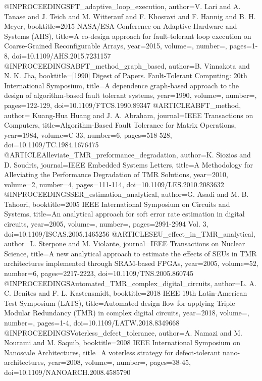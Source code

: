 @INPROCEEDINGS{FT_adaptive_loop_execution,
	author={V. {Lari} and A. {Tanase} and J. {Teich} and M. {Witterauf} and F. {Khosravi} and F. {Hannig} and B. H. {Meyer}},
	booktitle={2015 NASA/ESA Conference on Adaptive Hardware and Systems (AHS)}, 
	title={A co-design approach for fault-tolerant loop execution on Coarse-Grained Reconfigurable Arrays}, 
	year={2015},
	volume={},
	number={},
	pages={1-8},
	doi={10.1109/AHS.2015.7231157}
}
@INPROCEEDINGS{ABFT_method_graph_based,
	author={B. {Vinnakota} and N. K. {Jha}},
	booktitle={[1990] Digest of Papers. Fault-Tolerant Computing: 20th International Symposium}, 
	title={A dependence graph-based approach to the design of algorithm-based fault tolerant systems}, 
	year={1990},
	volume={},
	number={},
	pages={122-129},	
	doi={10.1109/FTCS.1990.89347}
}
@ARTICLE{ABFT_method,
	author={ {Kuang-Hua Huang} and J. A. {Abraham}},
	journal={IEEE Transactions on Computers}, 
	title={Algorithm-Based Fault Tolerance for Matrix Operations}, 
	year={1984},
	volume={C-33},
	number={6},
	pages={518-528},	
	doi={10.1109/TC.1984.1676475}
}
@ARTICLE{Alleviate_TMR_preformance_degradation,
	author={K. {Siozios} and D. {Soudris}},	
	journal={IEEE Embedded Systems Letters}, 	
	title={A Methodology for Alleviating the Performance Degradation of TMR Solutions}, 	
	year={2010},	
	volume={2},	
	number={4},	
	pages={111-114},
	doi={10.1109/LES.2010.2083632}
}
@INPROCEEDINGS{SER_estimation_analytical,
	author={G. {Asadi} and M. B. {Tahoori}},
	booktitle={2005 IEEE International Symposium on Circuits and Systems}, 
	title={An analytical approach for soft error rate estimation in digital circuits}, 
	year={2005},
	volume={},
	number={},
	pages={2991-2994 Vol. 3},	
	doi={10.1109/ISCAS.2005.1465256}
}
@ARTICLE{SEU_effect_in_TMR_analytical,
	author={L. {Sterpone} and M. {Violante}},
	journal={IEEE Transactions on Nuclear Science}, 
	title={A new analytical approach to estimate the effects of SEUs in TMR architectures implemented through SRAM-based FPGAs}, 
	year={2005},
	volume={52},
	number={6},
	pages={2217-2223},	
	doi={10.1109/TNS.2005.860745}
}
@INPROCEEDINGS{Automated_TMR_complex_digital_circuits,
	author={L. A. C. {Benites} and F. L. {Kastensmidt}},
	booktitle={2018 IEEE 19th Latin-American Test Symposium (LATS)}, 
	title={Automated design flow for applying Triple Modular Redundancy (TMR) in complex digital circuits}, 
	year={2018},
	volume={},
	number={},
	pages={1-4},	
	doi={10.1109/LATW.2018.8349668}
}
@INPROCEEDINGS{Voterless_defect_tolerance,
	author={A. {Namazi} and M. {Nourami} and M. {Saquib}},
	booktitle={2008 IEEE International Symposium on Nanoscale Architectures}, 
	title={A voterless strategy for defect-tolerant nano-architectures}, 
	year={2008},
	volume={},
	number={},
	pages={38-45},	
	doi={10.1109/NANOARCH.2008.4585790}
}
